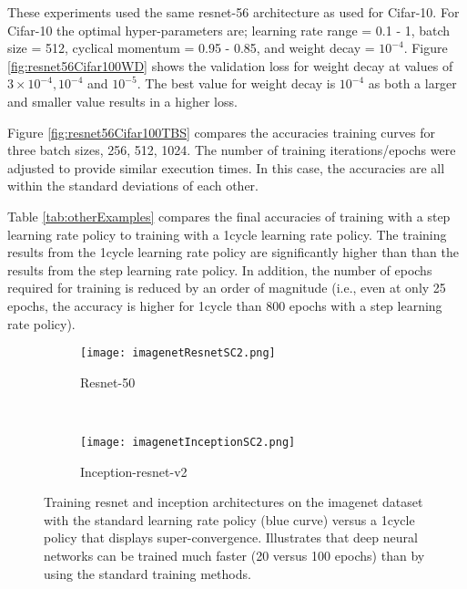 \documentclass{article} %
\begin{document}
These experiments used the same resnet-56 architecture as used for Cifar-10.  For Cifar-10 the optimal hyper-parameters are; learning rate range = 0.1 - 1, batch size = 512,  cyclical momentum = 0.95 - 0.85, and weight decay = $10^{-4}$.  Figure  \ref{fig:resnet56Cifar100WD} shows the validation loss for weight decay at values of  $ 3 \times 10^{-4}, 10^{-4} $ and $10^{-5} $.  The best value for  weight decay is $10^{-4}$ as both a larger and smaller value results in a higher loss.  

Figure \ref{fig:resnet56Cifar100TBS} compares the accuracies training curves for three batch sizes, 256, 512, 1024.  The number of training iterations/epochs were adjusted to provide similar execution times.  In this case, the accuracies are all within the standard deviations of each other.

Table \ref{tab:otherExamples} compares the final accuracies of training with a step learning rate policy to training with a 1cycle learning rate policy.  The training results from the 1cycle learning rate policy are significantly higher than than the results from the step learning rate policy.  In addition, the number of epochs required for training is reduced by an order of magnitude (i.e., even at only 25 epochs, the accuracy is higher for 1cycle than 800 epochs with a step learning rate policy).



\begin{figure}[tbh]
	\centering
	\begin{subfigure}[b]{0.47\textwidth}
		\texttt{[image: imagenetResnetSC2.png]}
		\caption{Resnet-50}
		\label{fig:imagenetResnetSC}       %
	\end{subfigure}
	\quad
	\hfill
	~ %
	\centering
	\begin{subfigure}[b]{0.46\textwidth}
		\texttt{[image: imagenetInceptionSC2.png]}
		\caption{Inception-resnet-v2}
		\label{fig:imagenetInceptionSC}       %
	\end{subfigure}
	\caption{Training resnet and inception architectures on the imagenet dataset with the standard learning rate policy (blue curve) versus a 1cycle policy that displays super-convergence.  Illustrates that deep neural networks can be trained much faster (20 versus 100 epochs) than by using the standard training methods.}
	\label{fig:imagenetResnet}
	\vspace{-5pt}	
\end{figure}
\end{document}

